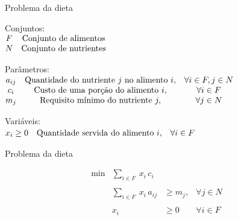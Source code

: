 \documentclass[compress,mathserif]{beamer}
\begin{document}

\begin{frame}{Problema da dieta}

Conjuntos: \\
\vspace{0.2cm}
$\begin{matrix}
F & \textnormal{Conjunto de alimentos} \\
N & \textnormal{Conjunto de nutrientes}
\end{matrix} 
$

\vspace{1cm}

Parâmetros: \\
\vspace{0.2cm}
$\begin{matrix}
a_{ij} & \textnormal{Quantidade do nutriente } j \textnormal{ no alimento } i, & \forall i \in F, j \in N\\
c_i & \textnormal{Custo de uma porção do alimento } i, & \forall i \in F \\
m_j & \textnormal{Requisito mínimo do nutriente } j, & \forall j \in N
\end{matrix}
$

\vspace{1cm}

Variáveis: \\
\vspace{0.2cm}
$\begin{matrix}
x_i \geq 0 & \textnormal{Quantidade servida do alimento } i, & \forall i \in F
\end{matrix}
$

\end{frame}


\begin{frame}{Problema da dieta}

$$\begin{matrix}
        \min & \sum_{i \in F}~x_i\,c_i\\  \\
             & \sum_{i \in F}~x_i\,a_{ij} & \geq m_j, & \forall j \in N \\ \\
             & x_i & \geq 0 & \forall i \in F
        \end{matrix}    
$$

\end{frame}
\end{document}
